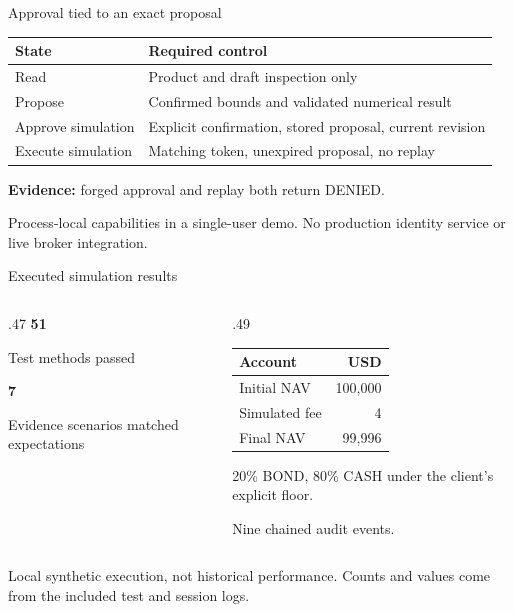 \documentclass[aspectratio=169,11pt]{beamer}
\begin{document}
\begin{frame}{Approval tied to an exact proposal}
\begin{tabular}{ll}\toprule
State & Required control\\\midrule
Read & Product and draft inspection only\\
Propose & Confirmed bounds and validated numerical result\\
Approve simulation & Explicit confirmation, stored proposal, current revision\\
Execute simulation & Matching token, unexpired proposal, no replay\\\bottomrule
\end{tabular}\par\vspace{7mm}
\textbf{Evidence:} forged approval and replay both return DENIED.\par\vspace{4mm}
\footnotesize Process-local capabilities in a single-user demo. No production identity service or live broker integration.
\end{frame}
\begin{frame}{Executed simulation results}
\begin{columns}[T]
\begin{column}{.47\textwidth}
{\Huge\bfseries 51}\par Test methods passed\par\vspace{5mm}
{\Huge\bfseries 7}\par Evidence scenarios matched expectations
\end{column}
\begin{column}{.49\textwidth}
\begin{tabular}{lr}\toprule
Account & USD\\\midrule
Initial NAV & 100,000\\
Simulated fee & 4\\
Final NAV & 99,996\\\bottomrule
\end{tabular}\par\vspace{4mm}
20\% BOND, 80\% CASH under the client's explicit floor.\par\vspace{3mm}
Nine chained audit events.
\end{column}
\end{columns}
\vspace{6mm}\footnotesize Local synthetic execution, not historical performance. Counts and values come from the included test and session logs.
\end{frame}
\end{document}

